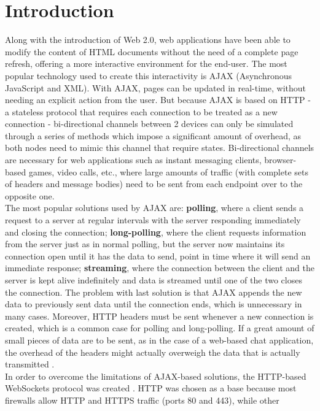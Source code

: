 \documentclass[conference]{IEEEtran}
\begin{document}
\section{Introduction}
Along with the introduction of Web 2.0, web applications have been able to
modify the content of HTML documents without the need of a complete page
refresh, offering a more interactive environment for the end-user.
The most popular technology used to create this interactivity is AJAX \cite{AJAX}
(Asynchronous JavaScript and XML). With AJAX, pages can be updated in real-time,
without needing an explicit action from the user. But because AJAX is based on
HTTP - a stateless protocol that requires each connection to be treated as a new
connection - bi-directional channels between 2 devices can only be simulated
through a series of methods which impose a significant amount of overhead, as both
nodes need to mimic this channel that require states.
Bi-directional channels are necessary for web applications such as instant
messaging clients, browser-based games, video calls, etc., where large amounts
of traffic (with complete sets of headers and message bodies) need to be sent from
each endpoint over to the opposite one.
\\
\indent
The most popular solutions used by AJAX are: \textbf{polling}, where a client sends
a request to a server at regular intervals with the server responding immediately
and closing the connection; \textbf{long-polling}, where the client requests
information from the server just as in normal polling, but the server now maintains
its connection open until it has the data to send, point in time where
it will send an immediate response;
\textbf{streaming}, where the connection between the client and the server is
kept alive indefinitely and data is streamed until one of the two closes the
connection. The problem with last solution is that AJAX
appends the new data to previously sent data until the connection ends, which is
unnecessary in many cases. Moreover, HTTP headers must be sent whenever a new
connection is created, which is a common case for polling and long-polling. If
a great amount of small pieces of data are to be sent, as in the case of a
web-based chat application, the overhead of the headers might actually overweigh
the data that is actually transmitted \cite{2009:Misc}.
\\
\indent
In order to overcome the limitations of AJAX-based solutions, the HTTP-based
WebSockets protocol was created \cite{RFC}. HTTP was chosen as a base because
most firewalls allow HTTP and HTTPS traffic  (ports 80 and 443), while other
\end{document}
